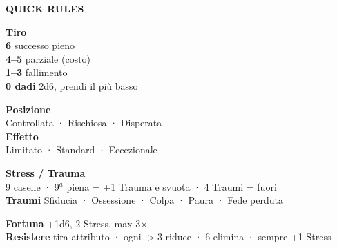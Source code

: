 \documentclass[10pt]{article}
\newcommand{\sez}[1]{%
  {\cinzel\fontsize{7.5}{9}\selectfont\color{oro}\bfseries\MakeUppercase{#1}}\par
  \vspace{0.5pt}{\color{oro!50}\rule{\linewidth}{0.4pt}}\par\vspace{2pt}%
}
\newcommand{\lbl}[1]{{\cinzel\fontsize{7.5}{9}\selectfont\color{bordoscuro}\bfseries #1}}
\begin{document}
\vspace{5pt}
\begin{mdframed}[backgroundcolor=oro!6,linecolor=oro,linewidth=0.5pt,
  roundcorner=3pt,innerleftmargin=6pt,innerrightmargin=6pt,
  innertopmargin=3pt,innerbottommargin=4pt,skipabove=0pt,skipbelow=0pt]
\sez{Quick rules}
\noindent\begin{minipage}[t]{0.27\linewidth}
{\fontsize{8}{10}\selectfont
\lbl{Tiro}\\
\textbf{6} successo pieno\\
\textbf{4--5} parziale (costo)\\
\textbf{1--3} fallimento\\
\lbl{0 dadi} 2d6, prendi il più basso}
\end{minipage}\hfill
\begin{minipage}[t]{0.24\linewidth}
{\fontsize{8}{10}\selectfont
\lbl{Posizione}\\
Controllata · Rischiosa · Disperata\\[2pt]
\lbl{Effetto}\\
Limitato · Standard · Eccezionale}
\end{minipage}\hfill
\begin{minipage}[t]{0.23\linewidth}
{\fontsize{8}{10}\selectfont
\lbl{Stress / Trauma}\\
9 caselle · 9$^a$ piena = +1 Trauma e svuota · 4 Traumi = fuori\\[2pt]
\lbl{Traumi} Sfiducia · Ossessione · Colpa · Paura · Fede perduta}
\end{minipage}\hfill
\begin{minipage}[t]{0.22\linewidth}
{\fontsize{8}{10}\selectfont
\lbl{Fortuna} +1d6, 2 Stress, max 3$\times$\\[2pt]
\lbl{Resistere} tira attributo · ogni $>$3 riduce · 6 elimina · sempre +1 Stress}
\end{minipage}
\end{mdframed}
\end{document}
